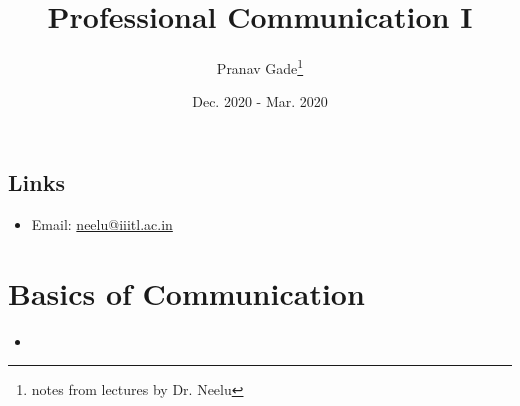 \documentclass[10pt, a4paper]{report}
\author{Pranav Gade\thanks{notes from lectures by Dr. Neelu}}
\date{Dec. 2020 - Mar. 2020}
\title{Professional Communication I}
\begin{document}
	\maketitle
	\section*{Links}
	\begin{itemize}
		\item Email: \href{mailto:neelu@iiitl.ac.in}{neelu@iiitl.ac.in}
	\end{itemize}
	\newpage
	
	\chapter{Basics of Communication}
		\begin{itemize}
			\item 
		\end{itemize}
\end{document}
